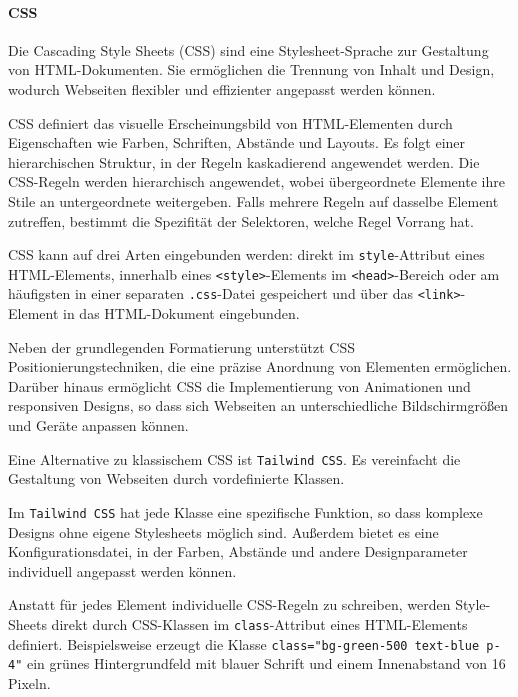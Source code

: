 \documentclass[12pt, letterpaper]{article}
\begin{document}
  \paragraph{CSS}  
  \par \textbf{}
  \par Die Cascading Style Sheets (CSS) sind eine Stylesheet-Sprache zur Gestaltung von HTML-Dokumenten. Sie ermöglichen die Trennung von Inhalt und Design, wodurch Webseiten flexibler und effizienter angepasst werden können.  
  \par CSS definiert das visuelle Erscheinungsbild von HTML-Elementen durch Eigenschaften wie Farben, Schriften, Abstände und Layouts. Es folgt einer hierarchischen Struktur, in der Regeln kaskadierend angewendet werden. Die CSS-Regeln werden hierarchisch angewendet, wobei übergeordnete Elemente ihre Stile an untergeordnete weitergeben. Falls mehrere Regeln auf dasselbe Element zutreffen, bestimmt die Spezifität der Selektoren, welche Regel Vorrang hat.  
  \par CSS kann auf drei Arten eingebunden werden: direkt im \texttt{style}-Attribut eines HTML-Elements, innerhalb eines \texttt{<style>}-Elements im \texttt{<head>}-Bereich oder am häufigsten in einer separaten \texttt{.css}-Datei gespeichert und über das \texttt{<link>}-Element in das HTML-Dokument eingebunden.  
  \par Neben der grundlegenden Formatierung unterstützt CSS Positionierungstechniken, die eine präzise Anordnung von Elementen ermöglichen. Darüber hinaus ermöglicht CSS die Implementierung von Animationen und responsiven Designs, so dass sich Webseiten an unterschiedliche Bildschirmgrößen und Geräte anpassen können.  
  \par Eine Alternative zu klassischem CSS ist \texttt{Tailwind CSS}. Es vereinfacht die Gestaltung von Webseiten durch vordefinierte Klassen. 
  \par Im \texttt{Tailwind CSS} hat jede Klasse eine spezifische Funktion, so dass komplexe Designs ohne eigene Stylesheets möglich sind. Außerdem bietet es eine Konfigurationsdatei, in der Farben, Abstände und andere Designparameter individuell angepasst werden können.
  \par Anstatt für jedes Element individuelle CSS-Regeln zu schreiben, werden Style-Sheets direkt durch CSS-Klassen im \texttt{class}-Attribut eines HTML-Elements definiert. Beispielsweise erzeugt die Klasse \texttt{class="bg-green-500 text-blue p-4"} ein grünes Hintergrundfeld mit blauer Schrift und einem Innenabstand von 16 Pixeln.
\end{document}

